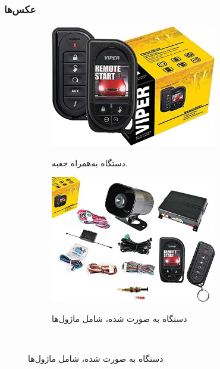 \documentclass[a4paper,12pt]{report}
\begin{document}
	\subsubsection{
		عکس‌ها
	}\label{subsubsec2:subsec1:sec3:chap1}
	\begin{figure}[!h]
		\centering
		\footnotesize
		\begin{subfigure}[t]{0.3\linewidth}
			\centering
			\includegraphics[width=0.8\textwidth]{resources/viper_5906V_1.jpg}
			\label{subfig1:fig1:sec3:chap1}
			\caption{
				دستگاه
				به‌همراه جعبه.
			}
		\end{subfigure}
		\hspace*{1cm}
		\begin{subfigure}[t]{0.3\linewidth}
			\centering
			\includegraphics[width=0.8\textwidth]{resources/viper_5906V_2.jpg}
			\label{subfig2:fig1:sec3:chap1}
			\caption{
				دستگاه 	به صورت
				شده، شامل ماژول‌ها
			}
		\end{subfigure}
		\\\vspace*{5mm}%

\end{figure}
\end{document}
